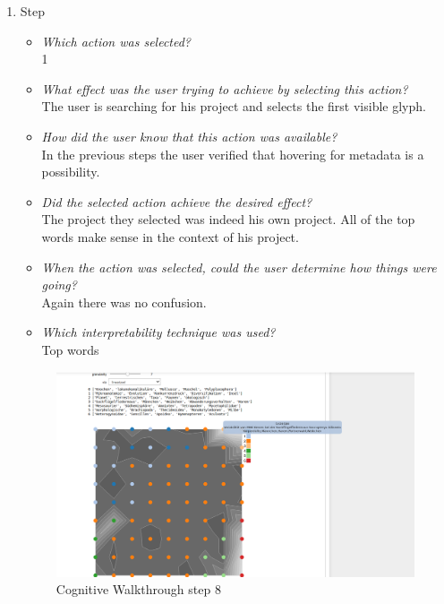 {\begin{enumerate}
		\item Step
		\begin{itemize}
			\item \textit{Which action was selected?} \\
			1
			\item \textit{What effect was the user trying to achieve by selecting this action?} \\
			The user is searching for his project and selects the first visible glyph. 
			\item \textit{How did the user know that this action was available?} \\
			In the previous steps the user verified that hovering for metadata is a possibility. 
			\item \textit{Did the selected action achieve the desired effect?} \\
			The project they selected was indeed his own project. All of the top words make sense in the context of his project. 
			\item \textit{When the action was selected, could the user determine how things were going?} \\
			Again there was no confusion.
			\item \textit{Which interpretability technique was used?}\\
			Top words
		\end{itemize}
		\begin{figure}[H]
			\centering
			\includegraphics[width=400px]{../chapters/validation/pics/6_c}
			\caption{\label{pic:step8} Cognitive Walkthrough step 8}
		\end{figure} \newpage
		

\end{enumerate}}
